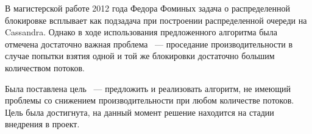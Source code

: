 В магистерской работе 2012 года Федора Фоминых задача о распределенной блокировке всплывает как подзадача при построении распределенной очереди на Cassandra. Однако в ходе использования предложенного алгоритма была отмечена достаточно важная проблема ~--- проседание производительности в случае попытки взятия одной и той же блокировки достаточно большим количеством потоков.

Была поставлена цель ~--- предложить и реализовать алгоритм, не имеющий проблемы со снижением производительности при любом количестве потоков. Цель была достигнута, на данный момент решение находится на стадии внедрения в проект.